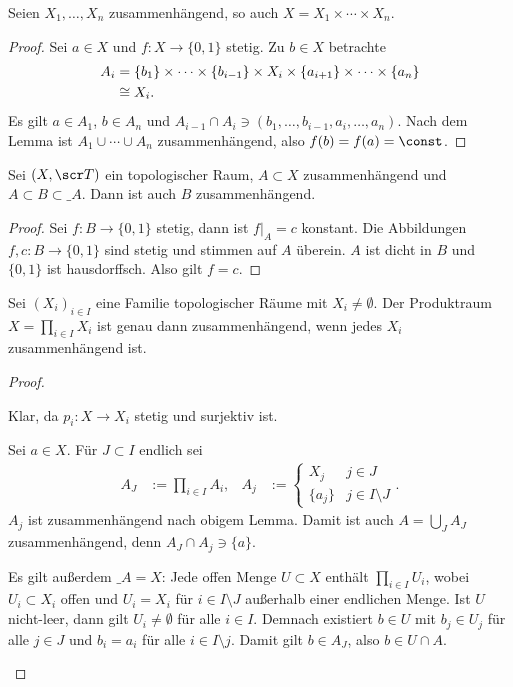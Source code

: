 \begin{lem}
	Seien $X_1, \dotsc, X_n$ zusammenhängend, so auch $X = X_1 \times \dotsb \times X_n$.
	\begin{proof}
		Sei $a \in X$ und $f: X \to \{0,1\}$ stetig.
		Zu $b \in X$ betrachte
		\begin{align*}
			A_i &= \{ b_1 \} \times \dotsb \times \{b_{i-1}\} \times X_i \times \{a_{i+1}\} \times \dotsb \times \{a_n\} \\
			&\cong X_i.
		\end{align*}
		Es gilt $a \in A_1$, $b \in A_n$ und $A_{i-1} \cap A_i \ni (b_1, \dotsc, b_{i-1}, a_i, \dotsc, a_n)$.
		Nach dem Lemma ist $A_1 \cup \dotsb \cup A_n$ zusammenhängend, also $f(b) = f(a) = \const$.
	\end{proof}
\end{lem}

\begin{lem}
	Sei $(X, \scr T)$ ein topologischer Raum, $A \subset X$ zusammenhängend und $A \subset B \subset \_A$.
	Dann ist auch $B$ zusammenhängend.
	\begin{proof}
		Sei $f: B \to \{0,1\}$ stetig, dann ist $f|_A = c$ konstant.
		Die Abbildungen $f, c: B \to \{0,1\}$ sind stetig und stimmen auf $A$ überein.
		$A$ ist dicht in $B$ und $\{0,1\}$ ist hausdorffsch.
		Also gilt $f=c$.
	\end{proof}
\end{lem}

\begin{st}
	Sei $(X_i)_{i\in I}$ eine Familie topologischer Räume mit $X_i \neq \emptyset$.
	Der Produktraum $X = \prod_{i\in I} X_i$ ist genau dann zusammenhängend, wenn jedes $X_i$ zusammenhängend ist.
	\begin{proof}
		\begin{segnb}[„$\implies$“]
			Klar, da $p_i: X \to X_i$ stetig und surjektiv ist.
		\end{segnb}
		\begin{segnb}[„$\implies$“]
			Sei $a \in X$.
			Für $J \subset I$ endlich sei
			\begin{align*}
				A_J &:= \prod_{i\in I} A_i, &
				A_j &:= \begin{cases}
					X_j & j \in J \\
					\{a_j\} & j \in I \setminus J
				\end{cases}.
			\end{align*}
			$A_j$ ist zusammenhängend nach obigem Lemma.
			Damit ist auch $A = \bigcup_{J} A_J$ zusammenhängend, denn $A_J \cap A_j \ni \{a\}$.

			Es gilt außerdem $\_A = X$:
			Jede offen Menge $U \subset X$ enthält $\prod_{i \in I} U_i$, wobei $U_i \subset X_i$ offen und $U_i = X_i$ für $i \in I \setminus J$ außerhalb einer endlichen Menge.
			Ist $U$ nicht-leer, dann gilt $U_i \neq \emptyset$ für alle $i \in I$.
			Demnach existiert $b \in U$ mit $b_j \in U_j$ für alle $j \in J$ und $b_i = a_i$ für alle $i \in I \setminus j$.
			Damit gilt $b \in A_J$, also $b \in U \cap A$.
		\end{segnb}
	\end{proof}
\end{st}

